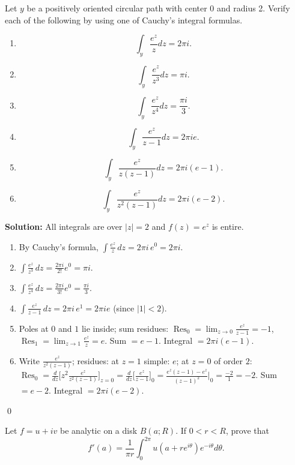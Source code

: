 \begin{problembox}
Let \( y \) be a positively oriented circular path with center 0 and radius 2. Verify each of the following by using one of Cauchy's integral formulas.
\begin{enumerate}[label=(\alph*)]
\item \[ \int_y \frac{e^z}{z} dz = 2\pi i. \]
\item \[ \int_y \frac{e^z}{z^3} dz = \pi i. \]
\item \[ \int_y \frac{e^z}{z^4} dz = \frac{\pi i}{3}. \]
\item \[ \int_y \frac{e^z}{z - 1} dz = 2\pi ie. \]
\item \[ \int_y \frac{e^z}{z(z - 1)} dz = 2\pi i(e - 1). \]
\item \[ \int_y \frac{e^z}{z^2(z - 1)} dz = 2\pi i(e - 2). \]
\end{enumerate}
\end{problembox}

\bigskip\noindent\textbf{Solution:}
All integrals are over $|z|=2$ and $f(z)=e^z$ is entire.
\begin{enumerate}[label=(\alph*)]
\item By Cauchy's formula, $\int\frac{e^z}{z}\,dz=2\pi i\,e^0=2\pi i$.
\item $\int\frac{e^z}{z^3}\,dz=\frac{2\pi i}{2!}e^0=\pi i$.
\item $\int\frac{e^z}{z^4}\,dz=\frac{2\pi i}{3!}e^0=\frac{\pi i}{3}$.
\item $\int\frac{e^z}{z-1}\,dz=2\pi i\,e^1=2\pi i e$ (since $|1|<2$).
\item Poles at $0$ and $1$ lie inside; sum residues: $\operatorname{Res}_{0}=\lim_{z\to0}\frac{e^z}{z-1}=-1$, $\operatorname{Res}_{1}=\lim_{z\to1}\frac{e^z}{z}=e$. Sum $=e-1$. Integral $=2\pi i(e-1)$.
\item Write $\frac{e^z}{z^2(z-1)}$; residues: at $z=1$ simple: $e$; at $z=0$ of order $2$: $\operatorname{Res}_{0}=\frac{d}{dz}\big[z^2\frac{e^z}{z^2(z-1)}\big]_{z=0}=\frac{d}{dz}\big[\frac{e^z}{z-1}\big]_{0}=\frac{e^z(z-1)-e^z}{(z-1)^2}\Big|_{0}=\frac{-2}{1}= -2$. Sum $=e-2$. Integral $=2\pi i(e-2)$.
\end{enumerate}\qed


\begin{problembox}
Let \( f = u + iv \) be analytic on a disk \( B(a; R) \). If \( 0 < r < R \), prove that
\[f'(a) = \frac{1}{\pi r} \int_0^{2\pi} u(a + re^{i\theta}) e^{-i\theta} d\theta.\]
\end{problembox}

